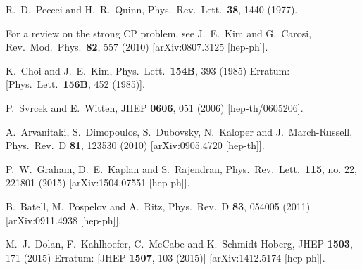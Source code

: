 \documentclass[preprint,prd,aps,tighten,nofootinbib,amssymb]{revtex4}
\begin{document}
\begin{thebibliography}{99}
 
  R.~D.~Peccei and H.~R.~Quinn,
  Phys.\ Rev.\ Lett.\  {\bf 38}, 1440 (1977).
 
  
  
 For a  review on the strong CP problem, see J.~E.~Kim and G.~Carosi,
  Rev.\ Mod.\ Phys.\  {\bf 82}, 557 (2010)
  [arXiv:0807.3125 [hep-ph]].
  

  
  K.~Choi and J.~E.~Kim,
  Phys.\ Lett.\  {\bf 154B}, 393 (1985)
  Erratum: [Phys.\ Lett.\  {\bf 156B}, 452 (1985)].
  
  
  P.~Svrcek and E.~Witten,
  JHEP {\bf 0606}, 051 (2006)
  [hep-th/0605206].
  
  A.~Arvanitaki, S.~Dimopoulos, S.~Dubovsky, N.~Kaloper and J.~March-Russell,
  Phys.\ Rev.\ D {\bf 81}, 123530 (2010)
  [arXiv:0905.4720 [hep-th]].
 
  P.~W.~Graham, D.~E.~Kaplan and S.~Rajendran,
  Phys.\ Rev.\ Lett.\  {\bf 115}, no. 22, 221801 (2015)
  [arXiv:1504.07551 [hep-ph]].


  B.~Batell, M.~Pospelov and A.~Ritz,
  Phys.\ Rev.\ D {\bf 83}, 054005 (2011)
  [arXiv:0911.4938 [hep-ph]].
  
  M.~J.~Dolan, F.~Kahlhoefer, C.~McCabe and K.~Schmidt-Hoberg,
  JHEP {\bf 1503}, 171 (2015)
  Erratum: [JHEP {\bf 1507}, 103 (2015)]
  [arXiv:1412.5174 [hep-ph]].
  

\end{thebibliography}
\end{document}
